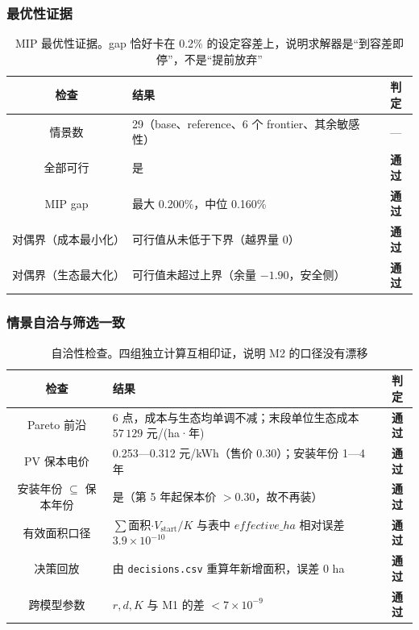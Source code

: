 \documentclass[11pt,a4paper]{ctexart}
\newcommand{\ok}{\textcolor{okc}{\textbf{通过}}}
\begin{document}
\subsubsection{最优性证据}

\begin{table}[htbp]\centering\small
\begin{tabularx}{\textwidth}{|c|X|c|}
\toprule
检查 & 结果 & 判定 \\
\midrule
情景数 & 29（base、reference、6 个 frontier、其余敏感性） & — \\
全部可行 & 是 & \ok \\
MIP gap & 最大 0.200\%，中位 0.160\% & \ok \\
对偶界（成本最小化） & 可行值从未低于下界（越界量 0） & \ok \\
对偶界（生态最大化） & 可行值未超过上界（余量 $-1.90$，安全侧） & \ok \\
\bottomrule
\end{tabularx}
\caption{MIP 最优性证据。gap 恰好卡在 0.2\% 的设定容差上，说明求解器是“到容差即停”，不是“提前放弃”}\label{tab:m2mip}
\end{table}

\subsubsection{情景自洽与筛选一致}

\begin{table}[htbp]\centering\small
\begin{tabularx}{\textwidth}{|c|X|c|}
\toprule
检查 & 结果 & 判定 \\
\midrule
Pareto 前沿 & 6 点，成本与生态均单调不减；末段单位生态成本 $57\,129$ 元/(ha·年) & \ok \\
PV 保本电价 & 0.253—0.312 元/kWh（售价 0.30）；安装年份 1—4 年 & \ok \\
安装年份 $\subseteq$ 保本年份 & 是（第 5 年起保本价 $>0.30$，故不再装） & \ok \\
有效面积口径 & $\sum$面积$\cdot V_{\text{start}}/K$ 与表中 $effective\_ha$ 相对误差 $3.9\times10^{-10}$ & \ok \\
决策回放 & 由 \texttt{decisions.csv} 重算年新增面积，误差 $0$ ha & \ok \\
跨模型参数 & $r,d,K$ 与 M1 的差 $<7\times10^{-9}$ & \ok \\
\bottomrule
\end{tabularx}
\caption{自洽性检查。四组独立计算互相印证，说明 M2 的口径没有漂移}\label{tab:m2self}
\end{table}
\end{document}
